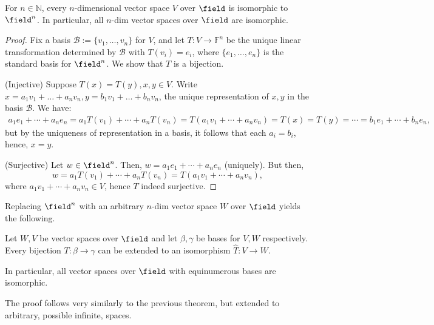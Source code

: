 \begin{theorem}
    For $n \in \mathbb{N}$, every $n$-dimensional vector space $V$ over $\field$ is isomorphic to $\field^n$. In particular, all $n$-dim vector spaces over $\field$ are isomorphic.
\end{theorem}
\begin{proof}
    Fix a basis $\mathcal{B} := \{v_1, \dots, v_n\}$ for $V$, and let $T: V \to \mathbb{F}^n$ be the unique linear transformation determined by $\mathcal{B}$ with $T(v_i) = e_i$, where $\{e_1, \dots, e_n\}$ is the standard basis for $\field^n$. We show that $T$ is a bijection.

    \noindent(Injective) Suppose $T(x) = T(y), x, y \in V$. Write $x = a_1 v_1 +\dots + a_n v_n, y = b_1 v_1 + \dots + b_n v_n$, the unique representation of $x, y$ in the basis $\mathcal{B}$. We have: \begin{align*}
        a_1 e_1 + \cdots + a_n e_n = a_1T(v_1) + \cdots + a_n T(v_n) = T(a_1v_1 + \cdots + a_n v_n) = T(x) = T(y) = \cdots = b_1 e_1 + \cdots + b_n e_n,
    \end{align*}
    but by the uniqueness of representation in a basis, it follows that each $a_i = b_i$, hence, $x = y$.

    \noindent(Surjective) Let $w \in \field^n$. Then, $w = a_1 e_1 + \cdots + a_n e_n$ (uniquely). But then, \[
    w = a_1T(v_1) + \cdots + a_nT(v_n) = T(a_1 v_1 + \cdots + a_n v_n),    
    \]
    where $a_1 v_1 + \cdots + a_n v_n \in V$, hence $T$ indeed surjective.
\end{proof}
\begin{remark}
    Replacing $\field^n$ with an arbitrary $n$-dim vector space $W$ over $\field$ yields the following.
\end{remark}

\begin{theorem}
    Let $W, V$ be vector spaces over $\field$ and let $\beta, \gamma$ be bases for $V, W$ respectively. Every bijection $T : \beta \to \gamma$ can be extended to an isomorphism $\hat{T} : V \to W$.

    In particular, all vector spaces over $\field$ with equinumerous bases are isomorphic.
\end{theorem}

\begin{remark}
    The proof follows very similarly to the previous theorem, but extended to arbitrary, possible infinite, spaces.
\end{remark}

